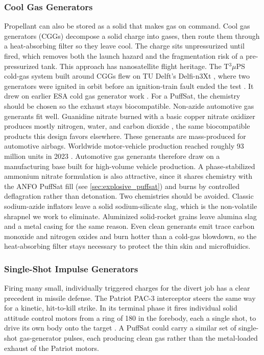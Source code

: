 \documentclass{article}
\begin{document}
\subsubsection{Cool Gas Generators}
Propellant can also be stored as a solid that makes gas on command. Cool gas generators (CGGs) decompose a solid charge into gases, then route them through a heat-absorbing filter so they leave cool. The charge sits unpressurized until fired, which removes both the launch hazard and the fragmentation risk of a pre-pressurized tank. This approach has nanosatellite flight heritage. The T$^3\mu$PS cold-gas system built around CGGs flew on TU Delft's Delfi-n3Xt \cite{cgg_delfi_n3xt}, where two generators were ignited in orbit before an ignition-train fault ended the test \cite{delfi_n3xt_inorbit}. It drew on earlier ESA cold gas generator work \cite{esa_cold_gas_generators}. For a PuffSat, the chemistry should be chosen so the exhaust stays biocompatible. Non-azide automotive gas generants fit well. Guanidine nitrate burned with a basic copper nitrate oxidizer produces mostly nitrogen, water, and carbon dioxide \cite{guanidine_nitrate_gas_generant}, the same biocompatible products this design favors elsewhere. These generants are mass-produced for automotive airbags. Worldwide motor-vehicle production reached roughly 93 million units in 2023 \cite{oica_production_2023}. Automotive gas generants therefore draw on a manufacturing base built for high-volume vehicle production. A phase-stabilized ammonium nitrate formulation is also attractive, since it shares chemistry with the ANFO PuffSat fill (see \autoref{sec:explosive_puffsat}) and burns by controlled deflagration rather than detonation. Two chemistries should be avoided. Classic sodium-azide inflators leave a solid sodium-silicate slag, which is the non-volatile shrapnel we work to eliminate. Aluminized solid-rocket grains leave alumina slag and a metal casing for the same reason. Even clean generants emit trace carbon monoxide and nitrogen oxides and burn hotter than a cold-gas blowdown, so the heat-absorbing filter stays necessary to protect the thin skin and microfluidics.

\subsubsection{Single-Shot Impulse Generators}
Firing many small, individually triggered charges for the divert job has a clear precedent in missile defense. The Patriot PAC-3 interceptor steers the same way for a kinetic, hit-to-kill strike. In its terminal phase it fires individual solid attitude control motors from a ring of 180 in the forebody, each a single shot, to drive its own body onto the target \cite{pac3_acm}. A PuffSat could carry a similar set of single-shot gas-generator pulses, each producing clean gas rather than the metal-loaded exhaust of the Patriot motors.
\end{document}
